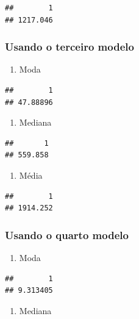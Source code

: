 \documentclass[]{article}
\providecommand{\tightlist}{%
  \setlength{\itemsep}{0pt}\setlength{\parskip}{0pt}}
\begin{document}
\begin{verbatim}
##        1 
## 1217.046
\end{verbatim}

\subsubsection{Usando o terceiro modelo}\label{usando-o-terceiro-modelo}

\begin{enumerate}
\def\labelenumi{\alph{enumi}.}
\tightlist
\item
  Moda
\end{enumerate}

\begin{verbatim}
##        1 
## 47.88896
\end{verbatim}

\begin{enumerate}
\def\labelenumi{\alph{enumi}.}
\setcounter{enumi}{1}
\tightlist
\item
  Mediana
\end{enumerate}

\begin{verbatim}
##       1 
## 559.858
\end{verbatim}

\begin{enumerate}
\def\labelenumi{\alph{enumi}.}
\setcounter{enumi}{2}
\tightlist
\item
  Média
\end{enumerate}

\begin{verbatim}
##        1 
## 1914.252
\end{verbatim}

\subsubsection{Usando o quarto modelo}\label{usando-o-quarto-modelo}

\begin{enumerate}
\def\labelenumi{\alph{enumi}.}
\tightlist
\item
  Moda
\end{enumerate}

\begin{verbatim}
##        1 
## 9.313405
\end{verbatim}

\begin{enumerate}
\def\labelenumi{\alph{enumi}.}
\setcounter{enumi}{1}
\tightlist
\item
  Mediana
\end{enumerate}
\end{document}
